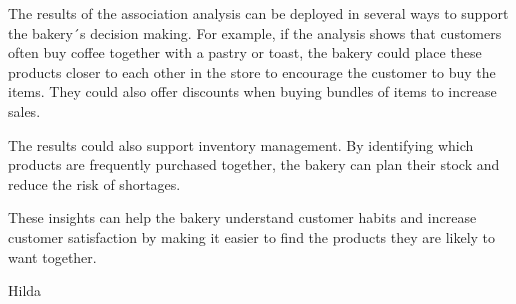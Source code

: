 \label{chap:deployment}
The results of the association analysis can be deployed in several ways to support the bakery´s decision making. 
For example, if the analysis shows that customers often buy coffee together with a pastry or toast, the bakery could place these products closer to each other in the store to encourage the customer to buy the items. 
They could also offer discounts when buying bundles of items to increase sales. 

The results could also support inventory management. 
By identifying which products are frequently purchased together, 
the bakery can plan their stock and reduce the risk of shortages.  

These insights can help the bakery understand customer habits and increase customer satisfaction by making it easier to find the products they are likely to want together. 


Hilda
